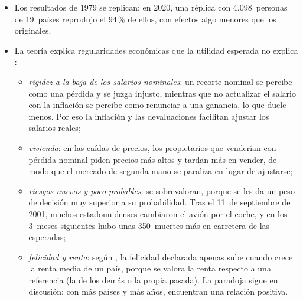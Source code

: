 \documentclass[11pt]{article}
\begin{document}
\begin{itemize}
\item Los resultados de 1979 se replican: en 2020, una réplica con 4.098~personas de 19~países reprodujo el 94\,\% de ellos, con efectos algo menores que los originales\nocite{Ruggeri2020Replicating}.
\item La teoría explica regularidades económicas que la utilidad esperada no explica :
  \begin{itemize}
  \item \emph{rigidez a la baja de los salarios nominales}: un recorte nominal se percibe como una pérdida y se juzga injusto, mientras que no actualizar el salario con la inflación se percibe como renunciar a una ganancia, lo que duele menos\nocite{KahnemanKnetschThaler1986Fairness}. Por eso la inflación y las devaluaciones facilitan ajustar los salarios reales;
  \item \emph{vivienda}: en las caídas de precios, los propietarios que venderían con pérdida nominal piden precios más altos y tardan más en vender, de modo que el mercado de segunda mano se paraliza en lugar de ajustarse\nocite{GenesoveMayer2001Loss};
  \item \emph{riesgos nuevos y poco probables}: se sobrevaloran, porque se les da un peso de decisión muy superior a su probabilidad. Tras el 11~de septiembre de 2001, muchos estadounidenses cambiaron el avión por el coche, y en los 3~meses siguientes hubo unas 350~muertes más en carretera de las esperadas\nocite{Gigerenzer2004Dread};
  \item \emph{felicidad y renta}: según \textcite{Easterlin1974Does}, la felicidad declarada apenas sube cuando crece la renta media de un país, porque se valora la renta respecto a una referencia (la de los demás o la propia pasada). La paradoja sigue en discusión: con más países y más años, \textcite{StevensonWolfers2008Economic} encuentran una relación positiva.
  \end{itemize}
\end{itemize}
\end{document}
